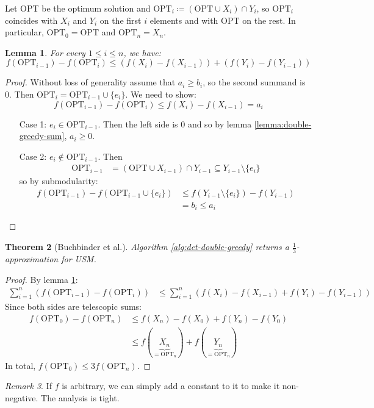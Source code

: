 \documentclass[11pt, a4paper]{article}
\newcommand{\mr}[1]{\mathrm{#1}}
\newcommand{\set}[1]{\{#1\}}
\newtheorem{theorem}{Theorem}[section]
\newtheorem{lemma}[theorem]{Lemma}
\theoremstyle{remark}
\newtheorem{remark}[theorem]{Remark}
\theoremstyle{definition}
\begin{document}
Let OPT be the optimum solution and $\mr{OPT}_i\coloneqq (\mr{OPT}
\cup X_i)\cap Y_i$, so $\mr{OPT}_i$ coincides with $X_i$ and $Y_i$ on
the first $i$ elements and with $\mr{OPT}$ on the rest. In particular,
$\mr{OPT}_0=\mr{OPT}$ and $\mr{OPT}_n=X_n$.

\begin{lemma}\label{lemma:double-greedy-2}
	For every $1\leq i\leq n$, we have:
	\[f(\mr{OPT}_{i-1})-f(\mr{OPT}_i)\leq (f(X_i)-f(X_{i-1}))+(f(Y_i)-f(Y_{i-1}))\]
\end{lemma}
\begin{proof}
	Without loss of generality assume that $a_i\geq b_i$, so the second summand
	is 0. Then $\mr{OPT}_i=\mr{OPT}_{i-1}\cup\set{e_i}$. We need to show:
	\[f(\mr{OPT}_{i-1})-f(\mr{OPT}_i)\leq f(X_i)-f(X_{i-1})=a_i\]
	\begin{enumerate}
		\item[Case 1:]
		$e_i\in\mr{OPT}_{i-1}$. Then the left side is 0 and so by lemma
		\ref{lemma:double-greedy-sum}, $a_i\geq0$.

		\item[Case 2:]
		$e_i\notin\mr{OPT}_{i-1}$. Then
		\begin{align*}
			\mr{OPT}_{i-1}&=(\mr{OPT}\cup X_{i-1})\cap Y_{i-1}\subseteq Y_{i-1}\setminus\set{e_i}
		\end{align*}
		so by submodularity:
		\begin{align*}
			f(\mr{OPT}_{i-1})-f(\mr{OPT}_{i-1}\cup\set{e_i})&\leq f(Y_{i-1}\setminus \set{e_i})-f(Y_{i-1}) \\
			&=b_i\leq a_i
		\end{align*}
	\end{enumerate}
\end{proof}

\begin{theorem}[Buchbinder et al.]
	Algorithm \ref{alg:det-double-greedy} returns a $\frac{1}{3}$-approximation
	for USM.
\end{theorem}
\begin{proof}
	By lemma \ref{lemma:double-greedy-2}:
	\begin{align*}
		\sum_{i=1}^n (f(\mr{OPT}_{i-1})-f(\mr{OPT}_i))&\leq \sum_{i=1}^n (f(X_i)-f(X_{i-1})+f(Y_i)-f(Y_{i-1}))
	\end{align*}
	Since both sides are telescopic sums:
	\begin{align*}
		f(\mr{OPT}_0)-f(\mr{OPT}_n)&\leq f(X_n)-f(X_0)+f(Y_n)-f(Y_0) \\
		&\leq f(\underbrace{X_n}_{=\mr{OPT}_n})+f(\underbrace{Y_n}_{=\mr{OPT}_n})
	\end{align*}
	In total, $f(\mr{OPT}_0)\leq 3f(\mr{OPT}_n)$.
\end{proof}
\begin{remark}
	If $f$ is arbitrary, we can simply add a constant to it to make it non-negative.
	The analysis is tight.
\end{remark}
\end{document}
